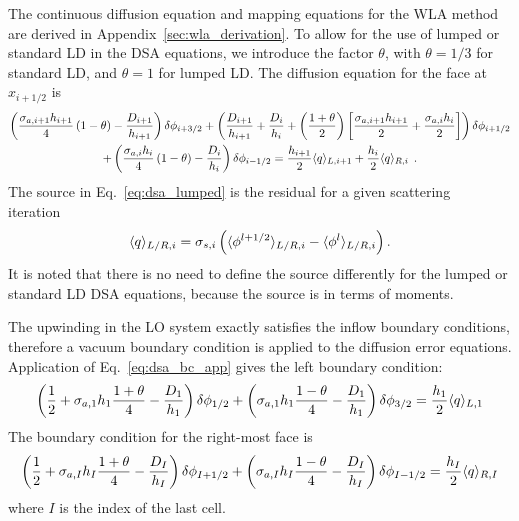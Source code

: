 The continuous diffusion equation and mapping equations for the WLA method are derived in Appendix~\ref{sec:wla_derivation}.
To allow for the use of lumped
or standard LD in the DSA equations, we introduce the factor $\theta$, with
$\theta=1/3$ for standard
LD, and $\theta=1$ for lumped LD.  The diffusion equation for the face at $x_{i+1/2}$ is 
\begin{multline}\label{eq:dsa_lumped}
    \left(\frac{\sigma_{a,i+1} h_{i+1}}{4}\left(1 - \theta\right)  -
        \frac{D_{i+1}}{h_{i+1}}\right)\delta\phi_{i+3/2} + \left(\frac{D_{i+1}}{h_{i+1}} +
        \frac{D_{i}}{h_i} + \left(\frac{1+\theta}{2} \right)\left[\frac{\sigma_{a,i+1} h_{i+1}}{2} + \frac{\sigma_{a,i}
        h_{i}}{2}\right]\right)\delta\phi_{i+1/2} \\ + \left(\frac{\sigma_{a,i}
        h_{i}}{4}\left(1 - \theta\right) -
        \frac{D_{i}}{h_{i}}\right)\delta\phi_{i-1/2} = \frac{h_{i+1}}{2} \langle q \rangle_{L,i+1} +
        \frac{h_{i}}{2}\langle q \rangle_{R,i}
        \;\,. 
\end{multline}
The source in Eq.~\eqref{eq:dsa_lumped} is the residual for a given scattering iteration~\cite{morel_dsa,lewis}
\begin{equation}\label{eq:dsa_src}
    \langle q \rangle_{L/R,i} = \sigma_{s,i}\left(\langle \phi^{l+1/2} \rangle_{L/R,i} -
    \langle \phi^{l} \rangle_{L/R,i}\right).
\end{equation}
It is noted that there is no need to define the source differently for the lumped or
standard LD DSA equations, because the source is in terms of moments.

The upwinding in the LO system exactly satisfies the inflow boundary conditions, therefore
a vacuum boundary condition is applied to the diffusion error equations.
Application of Eq.~\eqref{eq:dsa_bc_app} gives the left boundary condition:
\begin{equation}\label{eq:bc_dsa}
    \left(\frac{1}{2}+ \sigma_{a,1}h_1\frac{1+\theta}{4} - \frac{D_1}{h_1}\right)\delta\phi_{1/2} +
    \left( {\sigma_{a,1}{h_1}}\frac{1-\theta}{4} - \frac{D_1}{h_1}  \right)\delta \phi_{3/2} =
    \frac{h_1}{2} \langle q \rangle_{L,1}
\end{equation}
The boundary condition for the right-most face is
\begin{equation}\label{eq:bc_dsar}
    \left(\frac{1}{2}+ \sigma_{a,I}h_I\frac{1+\theta}{4} - \frac{D_I}{h_I}\right)\delta\phi_{I+1/2} +
    \left( {\sigma_{a,I}{h_I}}\frac{1-\theta}{4} - \frac{D_I}{h_I}  \right)\delta\phi_{I-1/2} =
    \frac{h_I}{2} \langle q \rangle_{R,I}
\end{equation}
where $I$ is the index of the last cell. 

